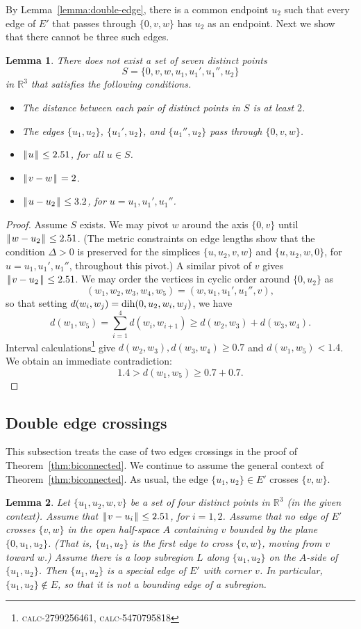 \documentclass[11pt]{amsart}
\def\op#1{{\text{#1}}}
\newcommand{\ring}[1]{\mathbb{#1}}
\def\dih{\op{dih}}
\def\text{\hbox}
\def\|{{\hskip0.1em|\hskip-0.15em|\hskip0.1em}}
\def\calc#1{{\textsc{calc-#1}}}
\newtheorem{lemma}{Lemma}
\begin{document}
By Lemma~\ref{lemma:double-edge}, there is a common endpoint $u_2$ such that every edge
of $E'$ that passes through $\{0,v,w\}$ has $u_2$ as an endpoint.
Next we show that there cannot be three such edges.  


\begin{lemma}\label{lemma:three-edge}
There does not exist a set of seven distinct points
$$S=\{0,v,w,u_1,u_1',u_1'',u_2\}$$ in $\ring{R}^3$ that satisfies
the following conditions.
\begin{itemize}
\item The distance between each pair of distinct points in $S$ is at least $2$.
\item The edges $\{u_1,u_2\}$, $\{u_1',u_2\}$, and $\{u_1'',u_2\}$ pass through
$\{0,v,w\}$.
\item $\|u\|\le 2.51$, for all $u\in S$.
\item $\|v-w\|=2$.
\item $\|u-u_2\|\le 3.2$, for $u=u_1,u_1',u_1''$.
\end{itemize}
\end{lemma}

\begin{proof}
Assume $S$ exists.
We may pivot $w$ around the axis $\{0,v\}$ until $\|w-u_2\|\le 2.51$.  (The metric constraints on
edge lengths show that the condition $\Delta>0$
is preserved for the simplices $\{u,u_2,v,w\}$ and $\{u,u_2,w,0\}$, for $u=u_1,u_1',u_1''$, throughout
this pivot.)  A similar
pivot of $v$ gives $\|v-u_2\|\le 2.51$.
We may order the vertices in cyclic order around $\{0,u_2\}$ as
$$(w_1,w_2,w_3,w_4,w_5)=(w,u_1,u_1',u_1'',v),$$ 
so that setting
$d(w_i,w_j) = \dih(0,u_2,w_i,w_j)$, we have
$$d(w_1,w_5)=\sum_{i=1}^4 d(w_i,w_{i+1})\ge d(w_2,w_3)+d(w_3,w_4).$$
Interval calculations\footnote{\calc{2799256461}, \calc{5470795818}} 
give $d(w_2,w_3),d(w_3,w_4)\ge 0.7$
and $d(w_1,w_5)< 1.4$. We obtain an immediate contradiction:
$$1.4 > d(w_1,w_5) \ge 0.7 + 0.7.$$
\end{proof}

\subsection*{Double edge crossings}

This subsection treats the case of two edges crossings in the proof
of Theorem~\ref{thm:biconnected}.
We continue to assume the general context of Theorem~\ref{thm:biconnected}.  As usual, 
the edge $\{u_1,u_2\}\in E'$ crosses $\{v,w\}$.

\begin{lemma}\label{lemma:special}
Let $\{u_1,u_2,w,v\}$ be a set of four distinct points
in $\ring{R}^3$ (in the given context).  
Assume that
 $\|v-u_i\|\le 2.51$, for $i=1,2$.
Assume that no edge of $E'$ crosses $\{v,w\}$
in the open 
half-space $A$ containing $v$ bounded by the plane $\{0,u_1,u_2\}$.
(That is, $\{u_1,u_2\}$ is the first edge to cross $\{v,w\}$, moving
from $v$ toward $w$.)
Assume there is a loop subregion $L$ along 
$\{u_1,u_2\}$ on the $A$-side
of $\{u_1,u_2\}$.  Then $\{u_1,u_2\}$ is a special edge of $E'$ with
corner $v$.
In particular, $\{u_1,u_2\}\not\in E$, so that it is not a bounding
edge of a subregion.
\end{lemma}
\end{document}
